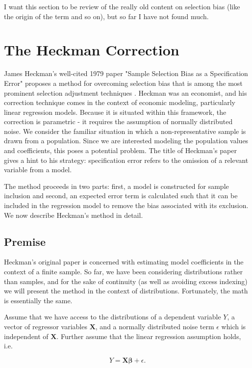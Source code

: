 \documentclass[12pt,twoside]{reedthesis}
\theoremstyle{definition}
\begin{document}
I want this section to be review of the really old content on selection bias (like the origin of the term and so on), but so far I have not found much.

\section{The Heckman Correction}
James Heckman's well-cited 1979 paper "Sample Selection Bias as a Specification Error" proposes a method for overcoming selection bias that is among the most prominent selection adjustment techniques \citep{Heckman_1979}. Heckman was an economist, and his correction technique comes in the context of economic modeling, particularly linear regression models. Because it is situated within this framework, the correction is parametric - it requires the  assumption of normally distributed noise. We consider the familiar situation in which a non-representative sample is drawn from a population. Since we are interested modeling the population values and coefficients, this poses a potential problem. The title of Heckman's paper gives a hint to his strategy: specification error refers to the omission of a relevant variable from a model. 

The method proceeds in two parts: first, a model is constructed for sample inclusion and second, an expected error term is calculated such that it can be included in the regression model to remove the bias associated with its exclusion. We now describe Heckman's method in detail.

\subsection{Premise}

Heckman's original paper is concerned with estimating model coefficients in the context of a finite sample. So far, we have been considering distributions rather than samples, and for the sake of continuity (as well as avoiding excess indexing) we will present the method in the context of distributions. Fortunately, the math is essentially the same.

Assume that we have access to the distributions of a dependent variable $Y$, a vector of regressor variables $\mathbf{X}$, and a normally distributed noise term $\epsilon$ which is independent of $\mathbf{X}$. Further assume that the linear regression assumption holds, i.e.

$$Y = \mathbf{X} \boldsymbol{\beta} + \epsilon.$$
\end{document}
